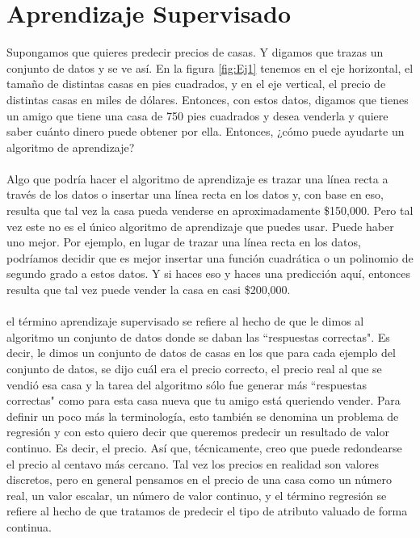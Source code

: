 \documentclass{report}
\begin{document}
\section{Aprendizaje Supervisado}
Supongamos que quieres
predecir precios de casas. Y digamos que trazas un conjunto de datos y se ve
así. En la figura \ref{fig:Ej1} tenemos en el eje horizontal, el tamaño de distintas casas en pies cuadrados,
y en el eje vertical, el precio de distintas casas en miles de dólares.
Entonces, con estos datos, digamos que tienes un amigo que tiene una casa de 750
pies cuadrados y desea venderla y quiere saber cuánto dinero puede
obtener por ella. Entonces, ¿cómo puede ayudarte un algoritmo de aprendizaje?\\\\ Algo que podría hacer
el algoritmo de aprendizaje es trazar una línea recta a través de los datos o insertar
una línea recta en los datos y, con base en eso, resulta que tal vez la casa pueda venderse
en aproximadamente \$150,000. Pero tal vez este no es el único algoritmo de aprendizaje que puedes
usar. Puede haber uno mejor. Por ejemplo, en lugar de trazar una línea
recta en los datos, podríamos decidir que es mejor insertar una función
cuadrática o un polinomio de segundo grado a estos datos. Y si haces eso y haces una
predicción aquí, entonces resulta que tal vez puede vender la casa en casi
\$200,000. \\\\
el término aprendizaje supervisado se refiere al hecho de que le dimos al algoritmo un conjunto de datos
donde se daban las ``respuestas correctas". Es decir, le dimos un conjunto de datos
de casas en los que para cada ejemplo del conjunto de datos, se dijo cuál era el
precio correcto, el precio real al que se vendió esa casa y la tarea del
algoritmo sólo fue generar más ``respuestas correctas" como para esta
casa nueva que tu amigo está queriendo vender. Para definir un poco más
la terminología, esto también se denomina un problema de regresión y con esto
quiero decir que queremos predecir un resultado de valor continuo. Es decir, el precio.
Así que, técnicamente, creo que puede redondearse el precio al centavo más cercano. Tal vez
los precios en realidad son valores discretos, pero en general pensamos en el precio de una casa
como un número real, un valor escalar, un número de valor continuo, y el término
regresión se refiere al hecho de que tratamos de predecir el tipo de atributo valuado
de forma continua.\\\\
\end{document}
